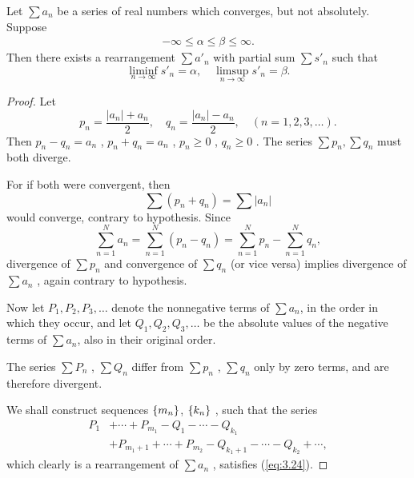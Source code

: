 \begin{thm}
    \label{thm:3.54 Riemann}
    Let $\sum a_n$ be a series of real numbers which converges, but not absolutely.
    Suppose
    \begin{align*}
        -\infty 
        \leq \alpha 
        \leq \beta 
        \leq \infty.
    \end{align*}
    Then there exists a rearrangement $\sum a'_n$ with partial sum $\sum s'_n$ such that 
    \begin{equation}
        \label{eq:3.24}
        \liminf_{n \to \infty} s'_n = \alpha,\quad
        \limsup_{n \to \infty} s'_n = \beta.
    \end{equation}
\end{thm}

\begin{proof}
    Let
    \begin{equation*}
        p_n = \frac{\left| a_n \right| + a_n}{2}, \quad
        q_n = \frac{\left| a_n \right| - a_n}{2}, \quad
        (n = 1,2,3,\dots).
    \end{equation*}
    Then $p_n - q_n = a_n$ , $p_n + q_n = a_n$ , $p_n \geq 0$ , $q_n \geq 0$ .
    The series $\sum p_n, \sum q_n$ must both diverge.

    For if both were convergent, then 
    \begin{equation*}
        \sum (p_n + q_n) = \sum \left| a_n \right| 
    \end{equation*}
    would converge, contrary to hypothesis. Since
    \begin{equation*}
        \sum_{n=1}^{N} a_n = 
        \sum_{n=1}^{N} (p_n - q_n) = 
        \sum_{n=1}^{N} p_n -
        \sum_{n=1}^{N} q_n ,
    \end{equation*}
    divergence of $\sum p_n$ and convergence of $\sum q_n$ (or vice versa) implies divergence of $\sum a_n$ , again contrary to hypothesis.

    Now let $P_1, P_2, P_3, \dots$ denote the nonnegative terms of $\sum a_n$, in the order in which they occur,
    and let $Q_1, Q_2, Q_3, \dots$ be the absolute values of the negative terms of $\sum a_n$, also in their original order.

    The series $\sum P_n$ , $\sum Q_n$ differ from $\sum p_n$ , $\sum q_n$ only by zero terms, and are therefore divergent.

    We shall construct sequences $\protect\{m_n\}$, $\protect\{k_n\}$ , such that the series 
    \begin{equation}
        \label{eq:3.25}
        \begin{aligned}
            P_1 
            &+ \cdots + P_{m_1} - Q_1 - \cdots - Q_{k_1} \\
            &+ P_{m_1 + 1} + \cdots + P_{m_2} - Q_{k_1 + 1} - \cdots - Q_{k_2} + \cdots,
        \end{aligned}
    \end{equation} 
    which clearly is a rearrangement of $\sum a_n$ , satisfies (\ref{eq:3.24}).


\end{proof}
